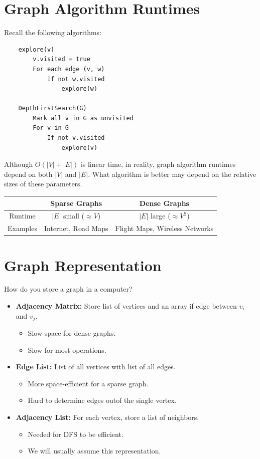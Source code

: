 \documentclass[letterpaper]{article}
\begin{document}
\section{Graph Algorithm Runtimes}
Recall the following algorithms: 
\begin{verbatim}
    explore(v)
        v.visited = true 
        For each edge (v, w)
            If not w.visited
                explore(w)

    DepthFirstSearch(G)
        Mark all v in G as unvisited
        For v in G
            If not v.visited
                explore(v)
\end{verbatim}
Although $O(|V| + |E|)$ is linear time, in reality, graph algorithm runtimes depend on both $|V|$ and $|E|$. What algorithm is better may depend on the relative sizes of these parameters.

\begin{center}
    \begin{tabular}{c|c|c}
                & \textbf{Sparse Graphs} & \textbf{Dense Graphs} \\ 
        \hline
        Runtime & $|E|$ small ($\approx V$) & $|E|$ large ($\approx V^2$) \\ 
        Examples & Internet, Road Maps & Flight Maps, Wireless Networks 
    \end{tabular}
\end{center}

\section{Graph Representation}
How do you store a graph in a computer?
\begin{itemize}
    \item \textbf{Adjacency Matrix:} Store list of vertices and an array  if edge between $v_i$ and $v_j$.
    \begin{itemize}
        \item Slow space for dense graphs.
        \item Slow for most operations.
    \end{itemize}

    \item \textbf{Edge List:} List of all vertices with list of all edges. 
    \begin{itemize}
        \item More space-efficient for a sparse graph. 
        \item Hard to determine edges outof the single vertex.
    \end{itemize}

    \item \textbf{Adjacency List:} For each vertex, store a list of neighbors.
    \begin{itemize}
        \item Needed for DFS to be efficient. 
        \item We will usually assume this representation.
    \end{itemize}
\end{itemize}
\end{document}
